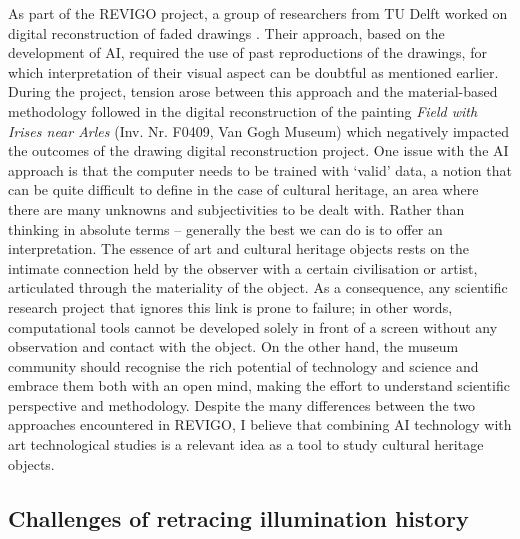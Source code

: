 As part of the \gls{REVIGO} project, a group of researchers from TU Delft worked on digital reconstruction of faded drawings \citep{zeng_multi-scale_2019}. Their approach, based on the development of \gls{AI}, required the use of past reproductions of the drawings, for which interpretation of their visual aspect can be doubtful as mentioned earlier. During the project, tension arose between this approach and the material-based methodology followed in the digital reconstruction of the painting \textit{Field with Irises near Arles} (Inv. Nr. F0409, Van Gogh Museum) which negatively impacted the outcomes of the drawing digital reconstruction project. One issue with the \gls{AI} approach is that the computer needs to be trained with ‘valid’ data, a notion that can be quite difficult to define in the case of  cultural heritage, an area where there are many unknowns and subjectivities to be dealt with. Rather than thinking in absolute terms – generally the best we can do is to offer an interpretation. The essence of art and cultural heritage objects rests on the intimate connection held by the observer with a certain civilisation or artist, articulated through the materiality of the object. As a consequence, any scientific research project that ignores this link is prone to failure; in other words, computational tools cannot be developed solely in front of a screen without any observation and contact with the object. On the other hand, the museum community should recognise the rich potential of technology and science and embrace them both with an open mind, making the effort to understand scientific perspective and methodology. Despite the many differences between the two approaches encountered in \gls{REVIGO}, I believe that combining \gls{AI} technology with art technological studies is a relevant idea as a tool to study cultural heritage objects. \\


\newpage
\subsection{Challenges of retracing illumination history}


